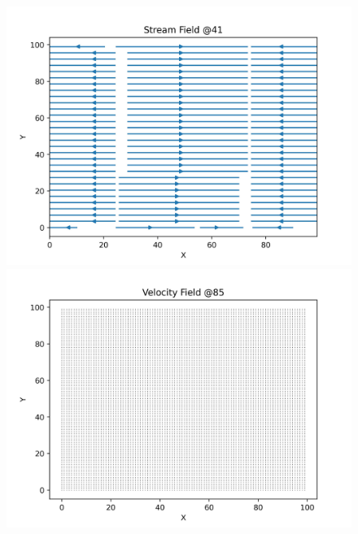 \begin{figure}[h!]
    \begin{minipage}{0.33\textwidth}
        \includegraphics[width=\linewidth]{graphs/ShearWaveDecay/DensityDistribution/stream_field_41}
    \end{minipage}%
    \begin{minipage}{0.33\textwidth}
        \includegraphics[width=\linewidth]{graphs/ShearWaveDecay/DensityDistribution/velocity_field_85}
    \end{minipage}%
    \begin{minipage}{0.33\textwidth}

\end{minipage}
\end{figure}
